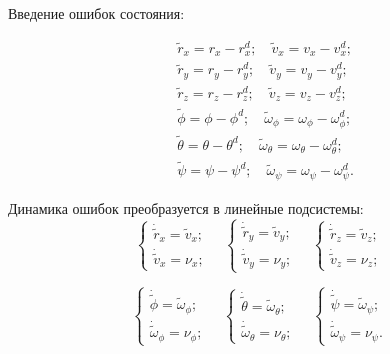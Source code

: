 Введение ошибок состояния:

\begin{equation}
\begin{aligned}
&\tilde{r}_x = r_x - r_x^d; \quad \tilde{v}_x = v_x - v_x^d; \\
&\tilde{r}_y = r_y - r_y^d; \quad \tilde{v}_y = v_y - v_y^d; \\
&\tilde{r}_z = r_z - r_z^d; \quad \tilde{v}_z = v_z - v_z^d; \\
&\tilde{\phi} = \phi - \phi^d; \quad \tilde{\omega}_\phi = \omega_\phi - \omega_\phi^d; \\
&\tilde{\theta} = \theta - \theta^d; \quad \tilde{\omega}_\theta = \omega_\theta - \omega_\theta^d; \\
&\tilde{\psi} = \psi - \psi^d; \quad \tilde{\omega}_\psi = \omega_\psi - \omega_\psi^d.
\end{aligned}
\end{equation}  

Динамика ошибок преобразуется в линейные подсистемы:  
\begin{equation}
\begin{cases} 
\dot{\tilde{r}}_x = \tilde{v}_x; \\
\dot{\tilde{v}}_x = \nu_x;
\end{cases}
\quad
\begin{cases} 
\dot{\tilde{r}}_y = \tilde{v}_y; \\
\dot{\tilde{v}}_y = \nu_y;
\end{cases}
\quad
\begin{cases} 
\dot{\tilde{r}}_z = \tilde{v}_z; \\
\dot{\tilde{v}}_z = \nu_z;
\end{cases}
\end{equation}
 
\begin{equation}
\begin{cases} 
\dot{\tilde{\phi}} = \tilde{\omega}_\phi; \\
\dot{\tilde{\omega}}_\phi = \nu_\phi;
\end{cases}
\quad
\begin{cases} 
\dot{\tilde{\theta}} = \tilde{\omega}_\theta; \\
\dot{\tilde{\omega}}_\theta = \nu_\theta;
\end{cases}
\quad
\begin{cases} 
\dot{\tilde{\psi}} = \tilde{\omega}_\psi; \\
\dot{\tilde{\omega}}_\psi = \nu_\psi.
\end{cases}
\end{equation}


